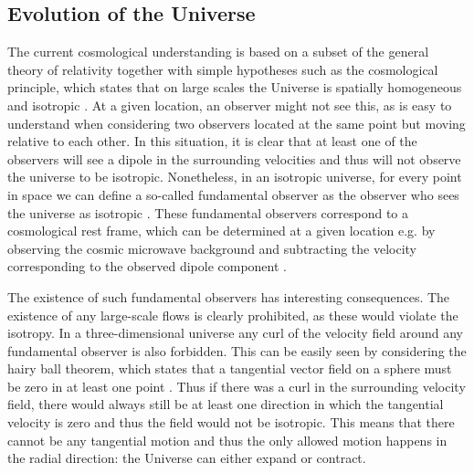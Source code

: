 \documentclass[english, oneside]{HYgradu}
\begin{document}
\subsection{Evolution of the Universe} \label{universe-evolution}

The current cosmological understanding is based on a subset of the general theory of relativity together with simple hypotheses such as the cosmological principle, which states that on large scales the Universe is spatially homogeneous and isotropic \citep{mo2010galaxy}. At a given location, an observer might not see this, as is easy to understand when considering two observers located at the same point but moving relative to each other. In this situation, it is  clear that at least one of the observers will see a dipole in the surrounding velocities and thus will not observe the universe to be isotropic. Nonetheless, in an isotropic universe, for every point in space we can define a so-called fundamental observer as the observer who sees the universe as isotropic \citep{mo2010galaxy}. These fundamental observers correspond to a cosmological rest frame, which can be determined at a given location e.g. by observing the cosmic microwave background and subtracting the velocity corresponding to the observed dipole component \citep{mo2010galaxy}.

The existence of such fundamental observers has interesting consequences. The existence of any large-scale flows is clearly prohibited, as these would violate the isotropy. In a three-dimensional universe any curl of the velocity field around any fundamental observer is also forbidden. This can be easily seen by considering the hairy ball theorem, which states that a tangential vector field on a sphere must be zero in at least one point \citep{renteln2013manifolds}. Thus if there was a curl in the surrounding velocity field, there would always still be at least one direction in which the tangential velocity is zero and thus the field would not be isotropic. This means that there cannot be any tangential motion and thus the only allowed motion happens in the radial direction: the Universe can either expand or contract.
\end{document}
